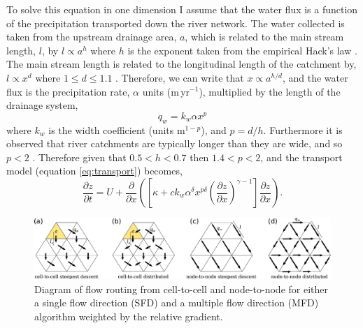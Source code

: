 \begin{subappendices}
To solve this equation in one dimension I assume that the water flux is a function of the precipitation transported down the river network. The water collected is taken from the upstream drainage area, $a$, which is related to the main stream length, $l$, by $l \propto a^{h}$ where $h$ is the exponent taken from the empirical Hack's law \citep{hack-1957}. The main stream length is related to the longitudinal length of the catchment by, $l \propto x^{d}$ where $1 \leq d \leq 1.1$ \citep{tarboton-etal-1990,maritan-etal-1996}. Therefore, we can write that $x \propto a^{h/d}$, and the water flux is the precipitation rate, $\alpha$ units (m\,yr$^{-1}$), multiplied by the length of the drainage system,
\begin{equation}
q_{w} = k_{w}\alpha x^{p}
\label{eq:waterflux}
\end{equation}
where $k_{w}$ is the width coefficient (units m$^{1-p}$), and $p = d/h$. Furthermore it is observed that river catchments are typically longer than they are wide, and so $p<2$ \citep{dodds-2000a}. Therefore given that $0.5 < h < 0.7$ \citep[e.g.][]{rigon-etal-1996} then $1.4 < p < 2$, and the transport model (equation \ref{eq:transport}) becomes,
\begin{equation}
\frac{\partial z}{\partial t} = U + \frac{\partial}{\partial x} \left(\left[\kappa +ck_{w}\alpha^{\delta}x^{p\delta}\left(\frac{\partial z}{\partial x}\right)^{\gamma-1}\right]\frac{\partial z}{\partial x}\right).
\label{eq:1dtransport}
\end{equation}

\begin{figure}
\centering
\includegraphics[width=\textwidth]{./figures/ch2-routing.pdf}
\caption{Diagram of flow routing from cell-to-cell and node-to-node for either a single flow direction (SFD) and a multiple flow direction (MFD) algorithm weighted by the relative gradient.}
\label{fg:routing}
\end{figure}


\end{subappendices}

